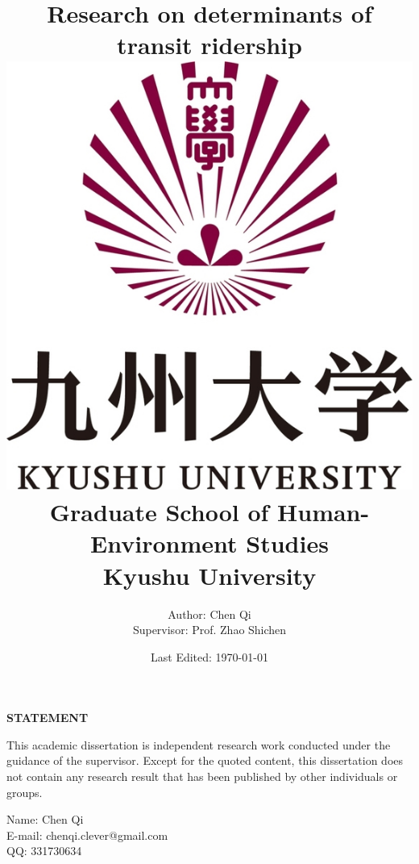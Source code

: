 \documentclass[12pt, twoside, a4paper]{book} %
\renewcommand{\baselinestretch}{1.5} %
\begin{document}
\title{
	{\Huge Research on determinants of transit ridership}\\
	{\vspace{3cm}}
	{\includegraphics[width=0.2\linewidth]{university.jpg}}\\
	{\vspace{2cm}}
	{\large Graduate School of Human-Environment Studies}\\
	{\large Kyushu University}
}
\author{
	{\large Author: Chen Qi}\\
	{\large Supervisor: Prof. Zhao Shichen}
	{\vspace{1cm}}
}
\date{\normalsize Last Edited: \today}
\maketitle

\centerline{\textbf{\Large STATEMENT}}
%
This academic dissertation is independent research work conducted under the guidance of the supervisor. Except for the quoted content, this dissertation does not contain any research result that has been published by other individuals or groups.\\
\newline
\newline
%
%

\begin{flushright}
	Name: Chen Qi \\
	E-mail: chenqi.clever@gmail.com \\
	QQ: 331730634 \\
\end{flushright}

\renewcommand{\baselinestretch}{1.0} %
\fontsize{14pt}{14pt} %
\selectfont

\tableofcontents %
\listoffigures %
\listoftables %

\frontmatter
\end{document}
